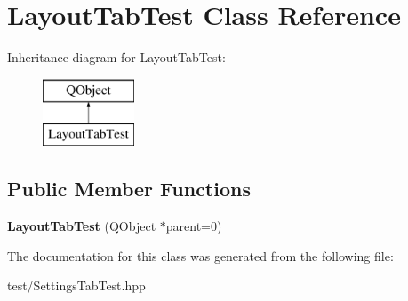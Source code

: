 \hypertarget{classLayoutTabTest}{\section{Layout\+Tab\+Test Class Reference}
\label{classLayoutTabTest}
}
Inheritance diagram for Layout\+Tab\+Test\+:\begin{figure}[H]
\begin{center}
\leavevmode
\includegraphics[height=2.000000cm]{classLayoutTabTest}
\end{center}
\end{figure}
\subsection*{Public Member Functions}
\begin{DoxyCompactItemize}
\item 
\hypertarget{classLayoutTabTest_ab0c7109022ac7f666bec3ff03f68cef3}{{\bfseries Layout\+Tab\+Test} (Q\+Object $\ast$parent=0)}\label{classLayoutTabTest_ab0c7109022ac7f666bec3ff03f68cef3}

\end{DoxyCompactItemize}


The documentation for this class was generated from the following file\+:\begin{DoxyCompactItemize}
\item 
test/Settings\+Tab\+Test.\+hpp\end{DoxyCompactItemize}
